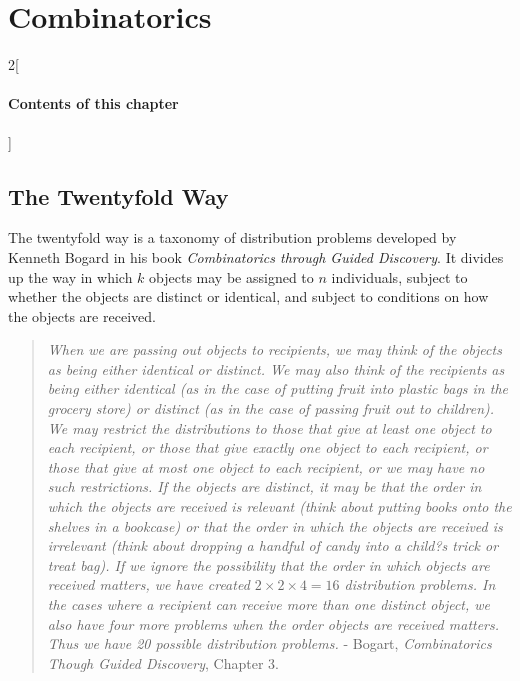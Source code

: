 \chapter{Combinatorics}

\begin{multicols}{2}[\subsubsection*{Contents of this chapter}]
\end{multicols}


\section{The Twentyfold Way}

The twentyfold way is a taxonomy of distribution problems developed by Kenneth Bogard in his book \textit{Combinatorics through Guided Discovery}. It divides up the way in which $k$ objects may be assigned to $n$ individuals, subject to whether the objects are distinct or identical, and subject to conditions on how the objects are received.


\begin{quote}
\textit{When we are passing out objects to recipients, we may think of the objects as being either identical or distinct. We may also think of the recipients as being either identical (as in the case of putting fruit into plastic bags in the grocery store) or distinct (as in the case of passing fruit out to children). We may restrict the distributions to those that give at least one object to each recipient, or those that give exactly one object to each recipient, or those that give at most one object to each recipient, or we may have no such restrictions. If the objects are distinct, it may be that the order in which the objects are received is relevant (think about putting books onto the shelves in a bookcase) or that the order in which the objects are received is irrelevant (think about dropping a handful of candy into a child?s trick or treat bag). If we ignore the possibility that the order in which objects are received matters, we have created $2\times2\times4 = 16$ distribution problems. In the cases where a recipient can receive more than one distinct object, we also have four more problems when the order objects are received matters. Thus we have 20 possible distribution problems.} - Bogart, \textit{Combinatorics Though Guided Discovery}, Chapter 3.
\end{quote}


